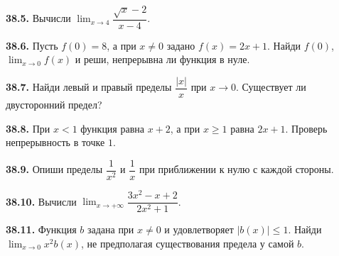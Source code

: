 \noindent\begin{minipage}[t]{\linewidth}\textbf{38.5.} Вычисли \(\lim_{x\to4}\dfrac{\sqrt x-2}{x-4}\).\par\end{minipage}\par
\noindent\begin{minipage}[t]{\linewidth}\textbf{38.6.} Пусть \(f(0)=8\), а при \(x\ne0\) задано \(f(x)=2x+1\). Найди \(f(0)\), \(\lim_{x\to0}f(x)\) и реши, непрерывна ли функция в нуле.\par\end{minipage}\par
\noindent\begin{minipage}[t]{\linewidth}\textbf{38.7.} Найди левый и правый пределы \(\dfrac{|x|}{x}\) при \(x\to0\). Существует ли двусторонний предел?\par\end{minipage}\par
\noindent\begin{minipage}[t]{\linewidth}\textbf{38.8.} При \(x<1\) функция равна \(x+2\), а при \(x\ge1\) равна \(2x+1\). Проверь непрерывность в точке \(1\).\par\end{minipage}\par
\noindent\begin{minipage}[t]{\linewidth}\textbf{38.9.} Опиши пределы \(\dfrac1{x^2}\) и \(\dfrac1x\) при приближении к нулю с каждой стороны.\par\end{minipage}\par
\noindent\begin{minipage}[t]{\linewidth}\textbf{38.10.} Вычисли \(\lim_{x\to+\infty}\dfrac{3x^2-x+2}{2x^2+1}\).\par\end{minipage}\par
\noindent\begin{minipage}[t]{\linewidth}\textbf{38.11.} Функция \(b\) задана при \(x\ne0\) и удовлетворяет \(|b(x)|\le1\). Найди \(\lim_{x\to0}x^2b(x)\), не предполагая существования предела у самой \(b\).\par\end{minipage}\par
